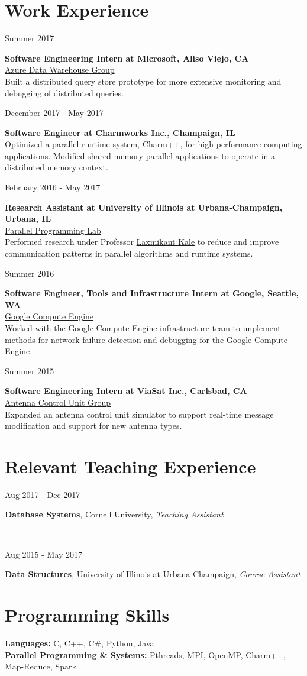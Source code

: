 \documentclass[10pt]{article}
\newcommand{\teachblock}[2]{
\begin{minipage}[t]{0.20\textwidth}
\vspace*{0.4em}
\begin{flushright}#2\end{flushright}
\end{minipage}
\hfill\vline\hfill
\begin{minipage}[t]{0.76\textwidth}
\vspace*{0.4em}
	#1
\end{minipage}
\vspace{0.2em}
}
\newcommand{\workblock}[4]{
\begin{minipage}[t]{0.14\textwidth}
\vspace*{0.4em}
\begin{flushright}#3\end{flushright}
\end{minipage}
\hfill\vline\hfill
\begin{minipage}[t]{0.82\textwidth}
\vspace*{0.4em}
	\textbf{#1} \\
	#2 \\
    #4
\end{minipage}
\vspace{0.7em}
}
\newcommand{\workblocktwo}[3]{
\begin{minipage}[t]{0.14\textwidth}
\vspace*{0.4em}
\begin{flushright}#2\end{flushright}
\end{minipage}
\hfill\vline\hfill
\begin{minipage}[t]{0.82\textwidth}
\vspace*{0.4em}
	\textbf{#1} \\
    #3
\end{minipage}
\vspace{0.7em}
}
\begin{document}
\section{Work Experience}
\vspace{-0.4em}
\workblock{Software Engineering Intern at Microsoft, Aliso Viejo, CA}{\href{https://azure.microsoft.com/en-us/services/sql-data-warehouse/}{Azure Data Warehouse Group}}{Summer 2017}{Built a distributed query store prototype for more extensive monitoring and debugging of distributed queries.} 

\workblocktwo{Software Engineer at \href{http://www.charmplusplus.com/}{Charmworks Inc.}, Champaign, IL}{December 2017 - May 2017}{Optimized a parallel
runtime system, Charm++\footnotemark[1], for high performance computing applications. Modified shared memory parallel applications to operate in a distributed memory context.} 

\workblock{Research Assistant at University of Illinois at Urbana-Champaign, Urbana, IL}{\href{http://charm.cs.uiuc.edu/}{Parallel Programming Lab}}{February 2016 - May 2017}{Performed research under Professor \href{http://charm.cs.uiuc.edu/~kale/}{Laxmikant Kale} to reduce and improve communication patterns in parallel algorithms and runtime systems.}

\workblock{Software Engineer, Tools and Infrastructure Intern at Google, Seattle, WA}{\href{https://cloud.google.com/compute/}{Google Compute Engine}}{Summer 2016}{Worked with the Google Compute Engine infrastructure team to implement methods for network failure detection and debugging for the Google Compute Engine.}

\workblock{Software Engineering Intern at ViaSat Inc., Carlsbad, CA}{\href{https://www.viasat.com/products/antenna-controllers}{Antenna Control Unit Group}}{Summer 2015}{Expanded an antenna control unit simulator to support real-time message modification and support for new antenna types.}

\vspace{-0.4em}

\section{Relevant Teaching Experience}
\vspace{-0.8em}
\teachblock{\textbf{Database Systems}, Cornell University, \textit{Teaching Assistant}}{Aug 2017 - Dec 2017} \\
\teachblock{\textbf{Data Structures}, University of Illinois at Urbana-Champaign, \textit{Course Assistant}}{Aug 2015 - May 2017}

\vspace{-0.44em}

\section{Programming Skills}
\vspace{0.1em}
\textbf{Languages:} C, C++, C\#, Python, Java \\
\textbf{Parallel Programming \& Systems:} Pthreads, MPI, OpenMP, Charm++, Map-Reduce, Spark
\end{document}
